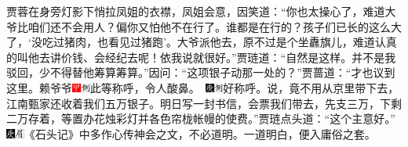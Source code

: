 {{{{{{{贾蓉在身旁灯影下悄拉凤姐的衣襟，凤姐会意，因笑道：“你也太操心了，难道大爷比咱们还不会用人？偏你又怕他不在行了。谁都是在行的？孩子们已长的这么大了，‘没吃过猪肉，也看见过猪跑’。大爷派他去，原不过是个坐纛旗儿，难道认真的叫他去讲价钱、会经纪去呢！依我说就很好。”贾琏道：“自然是这样。并不是我驳回，少不得替他筹算筹算。”因问：“这项银子动那一处的？”贾蔷道：“才也议到这里。赖爷爷{\includegraphics[width=3mm]{../Images/00002}\includegraphics[width=3mm]{../Images/00011}\footnotesize \kaishu 此等称呼，令人酸鼻。　\includegraphics[width=3mm]{../Images/00004}\includegraphics[width=3mm]{../Images/00011}\footnotesize \kaishu 好称呼。}说，竟不用从京里带下去，江南甄家还收着我们五万银子。明日写一封书信，会票我们带去，先支三万，下剩二万存着，等置办花烛彩灯并各色帘栊帐幔的使费。”贾琏点头道：“这个主意好。”{\includegraphics[width=3mm]{../Images/00004}\includegraphics[width=3mm]{../Images/00010}\footnotesize \kaishu 《石头记》中多作心传神会之文，不必道明。一道明白，便入庸俗之套。}

}}}}}}}
